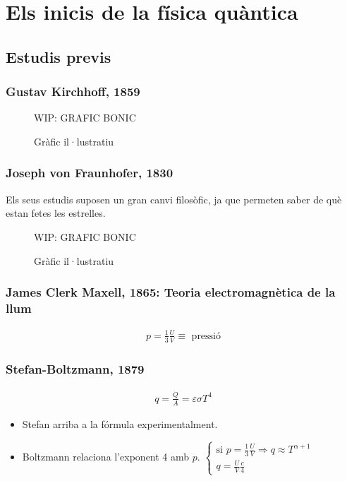 \section{Els inicis de la física quàntica}
\subsection{Estudis previs}
\subsubsection*{Gustav Kirchhoff, 1859}

\begin{figure}[H]
\centering
    WIP: GRAFIC BONIC 
\caption{Gràfic il·lustratiu}
\end{figure}

\subsubsection*{Joseph von Fraunhofer, 1830}
Els seus estudis suposen un gran canvi filosòfic, ja que permeten saber de què estan fetes les estrelles.
\begin{figure}[H]
\centering
    WIP: GRAFIC BONIC 
\caption{Gràfic il·lustratiu}
\end{figure}

\subsubsection*{James Clerk Maxell, 1865: Teoria electromagnètica de la llum}
\begin{align}
    p = \frac{1}{3} \frac{U}{V} \equiv \text{ pressió}
\end{align}

\subsubsection*{Stefan-Boltzmann, 1879}
\begin{align}
    q = \frac{\dot{Q}}{A} = \varepsilon \sigma T^{4}
\end{align}

\begin{itemize}
    \item Stefan arriba a la fórmula experimentalment.
    \item Boltzmann relaciona l'exponent 4 amb $p$. 
    $\begin{cases} \text{si } p = \frac{1}{3} \frac{U}{V} \Rightarrow q \approx T^{\alpha + 1} \\ q = \frac{U}{V} \frac{c}{4}\end{cases}$
\end{itemize}

